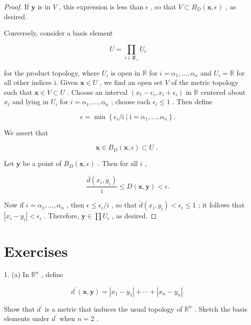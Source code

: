 \begin{proof}
If \(\mathbf{y}\) is in \(V\) , this expression is less than \(\epsilon\) , so that \(V \subset  {B}_{D}\left( {\mathbf{x},\epsilon }\right)\) , as desired.

Conversely, consider a basis element

\[
U = \mathop{\prod }\limits_{{i \in  {\mathbf{Z}}_{ + }}}{U}_{i}
\]

for the product topology, where \({U}_{i}\) is open in \(\mathbb{R}\) for \(i = {\alpha }_{1},\ldots ,{\alpha }_{n}\) and \({U}_{i} = \mathbb{R}\) for all other indices i. Given \(\mathbf{x} \in  U\) , we find an open set \(V\) of the metric topology such that \(\mathbf{x} \in  V \subset  U\) . Choose an interval \(\left( {{x}_{t} - {\epsilon }_{i},{x}_{i} + {\epsilon }_{i}}\right)\) in \(\mathbb{R}\) centered about \({x}_{t}\) and lying in \({U}_{i}\) for \(i = {\alpha }_{1},\ldots ,{\alpha }_{n}\) ; choose each \({\epsilon }_{i} \leq  1\) . Then define

\[
\epsilon  = \min \left\{  {{\epsilon }_{i}/\mathrm{i} \mid  \mathrm{i} = {\alpha }_{1},\ldots ,{\alpha }_{n}}\right\}  .
\]

We assert that

\[
\mathbf{x} \in  {B}_{D}\left( {\mathbf{x},\epsilon }\right)  \subset  U\text{ . }
\]

Let \(\mathbf{y}\) be a point of \({B}_{D}\left( {\mathbf{x},\epsilon }\right)\) . Then for all \(i\) ,

\[
\frac{\bar{d}\left( {{x}_{i},{y}_{i}}\right) }{\mathrm{i}} \leq  D\left( {\mathbf{x},\mathbf{y}}\right)  < \epsilon .
\]

Now if \(i = {\alpha }_{1},\ldots ,{\alpha }_{n}\) , then \(\epsilon  \leq  {\epsilon }_{i}/i\) , so that \(\widetilde{d}\left( {{x}_{i},{y}_{i}}\right)  < {\epsilon }_{i} \leq  1\) ; it follows that \(\left| {{x}_{i} - {y}_{i}}\right|  < {\epsilon }_{i}\) . Therefore, \(\mathbf{y} \in  \prod {U}_{i}\) , as desired.
\end{proof}

\section*{Exercises}

1. (a) In \({\mathbb{R}}^{n}\) , define

\[
{d}^{\prime }\left( {\mathbf{x},\mathbf{y}}\right)  = \left| {{x}_{1} - {y}_{1}}\right|  + \cdots  + \left| {{x}_{n} - {y}_{n}}\right| .
\]

Show that \({d}^{\prime }\) is a metric that induces the usual topology of \({\mathbb{R}}^{n}\) . Sketch the basis elements under \({d}^{\prime }\) when \(n = 2\) .

